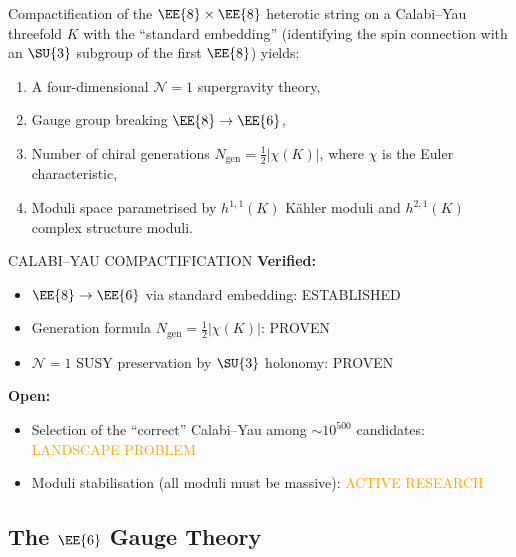\begin{theorem}
\label{thm:chsw}
Compactification of the $\EE{8}\times\EE{8}$ heterotic string on a Calabi--Yau
threefold $K$ with the ``standard embedding'' (identifying the spin connection
with an $\SU{3}$ subgroup of the first $\EE{8}$) yields:
\begin{enumerate}
    \item A four-dimensional $\mathcal{N}=1$ supergravity theory,
    \item Gauge group breaking $\EE{8} \to \EE{6}$,
    \item Number of chiral generations $N_{\mathrm{gen}}
          = \tfrac{1}{2}|\chi(K)|$, where $\chi$ is the Euler characteristic,
    \item Moduli space parametrised by $h^{1,1}(K)$ K\"ahler moduli and
          $h^{2,1}(K)$ complex structure moduli.
\end{enumerate}
\end{theorem}

\begin{factcheck}{CALABI--YAU COMPACTIFICATION}
\textbf{Verified:}
\begin{itemize}
    \item $\EE{8} \to \EE{6}$ via standard embedding:
          \textcolor{validcolor}{ESTABLISHED}~\cite{candelas1985vacuum}
    \item Generation formula $N_{\mathrm{gen}} = \tfrac{1}{2}|\chi(K)|$:
          \textcolor{validcolor}{PROVEN}
    \item $\mathcal{N}=1$ SUSY preservation by $\SU{3}$ holonomy:
          \textcolor{validcolor}{PROVEN}
\end{itemize}

\textbf{Open:}
\begin{itemize}
    \item Selection of the ``correct'' Calabi--Yau among $\sim 10^{500}$
          candidates: \textcolor{orange}{LANDSCAPE PROBLEM}
    \item Moduli stabilisation (all moduli must be massive):
          \textcolor{orange}{ACTIVE RESEARCH}
\end{itemize}
\end{factcheck}

\subsection{The $\EE{6}$ Gauge Theory}

